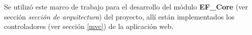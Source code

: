 Se utilizó este marco de trabajo para el desarrollo del módulo \textbf{EF\_Core} (ver sección \emph{sección de arquitectura}) del proyecto, allí están implementados los controladores (ver sección \ref{mvc}) de la aplicación web.